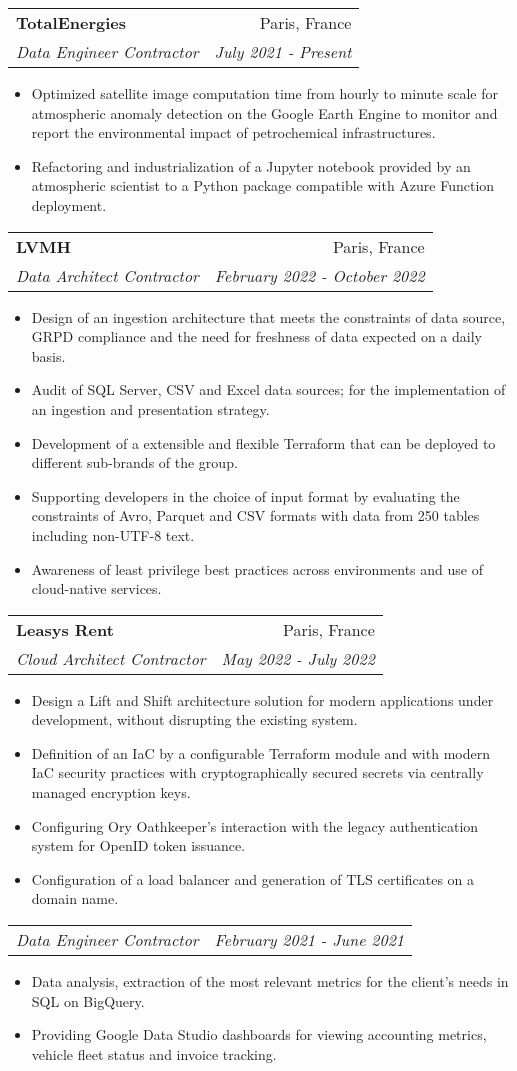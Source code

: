 \documentclass[letterpaper,11pt]{article}
\makeatletter
\newcommand{\resumeItem}[1]{
  \item\small{#1 \vspace{-2pt}}
}
\newcommand{\resumeSubheading}[4]{
  \vspace{-1pt}\item
    \begin{tabular*}{0.97\textwidth}[t]{l@{\extracolsep{\fill}}r}
      \textbf{#1} & #2 \\
      \textit{\small#3} & \textit{\small #4} \\
    \end{tabular*}\vspace{-5pt}
}
\newcommand{\resumeSubSubheading}[2]{
  \begin{tabular*}{0.97\textwidth}{l@{\extracolsep{\fill}}r}
    \textit{\small#1} & \textit{\small #2} \\
  \end{tabular*}\vspace{-5pt}
}
\newcommand{\resumeItemListStart}{\begin{itemize}}
\newcommand{\resumeItemListEnd}{\end{itemize}\vspace{-5pt}}
\makeatother
\begin{document}
\resumeSubheading{TotalEnergies}
{Paris, France}
{Data Engineer Contractor}
{July 2021 - Present}
\resumeItemListStart{}
\resumeItem{
  Optimized satellite image computation time from hourly to minute scale for
  atmospheric anomaly detection on the Google Earth Engine to monitor and report
  the environmental impact of petrochemical infrastructures.
}
\resumeItem{
  Refactoring and industrialization of a Jupyter notebook provided by an
  atmospheric scientist to a Python package compatible with Azure Function
  deployment.
}
\resumeItemListEnd{}


\resumeSubheading{LVMH}
{Paris, France}
{Data Architect Contractor}
{February 2022 - October 2022}
\resumeItemListStart{}
\resumeItem{
  Design of an ingestion architecture that meets the constraints of data source,
  GRPD compliance and the need for freshness of data expected on a daily basis.
}
\resumeItem{
  Audit of SQL Server, CSV and Excel data sources; for the implementation of an
  ingestion and presentation strategy.
}
\resumeItem{
  Development of a extensible and flexible Terraform that can be deployed to
  different sub-brands of the group.
}
\resumeItem{
  Supporting developers in the choice of input format by evaluating the
  constraints of Avro, Parquet and CSV formats with data from 250 tables including
  non-UTF-8 text.
}
\resumeItem{
  Awareness of least privilege best practices across environments and use of
  cloud-native services.
}
\resumeItemListEnd{}


\resumeSubheading{Leasys Rent}
{Paris, France}
{Cloud Architect Contractor}
{May 2022 - July 2022}
\resumeItemListStart{}
\resumeItem{
  Design a Lift and Shift architecture solution for modern applications under
  development, without disrupting the existing system.
}
\resumeItem{
  Definition of an IaC by a configurable Terraform module and with modern IaC
  security practices with cryptographically secured secrets via centrally managed
  encryption keys.
}
\resumeItem{
  Configuring Ory Oathkeeper's interaction with the legacy authentication system
  for OpenID token issuance.
}
\resumeItem{
  Configuration of a load balancer and generation of TLS certificates on a domain
  name.
}
\resumeItemListEnd{}

\resumeSubSubheading{Data Engineer Contractor}
{February 2021 - June 2021}
\resumeItemListStart{}
\resumeItem{
  Data analysis, extraction of the most relevant metrics for the client's needs in
  SQL on BigQuery.
}
\resumeItem{
  Providing Google Data Studio dashboards for viewing accounting metrics, vehicle
  fleet status and invoice tracking.
}
\resumeItemListEnd{}
\end{document}

